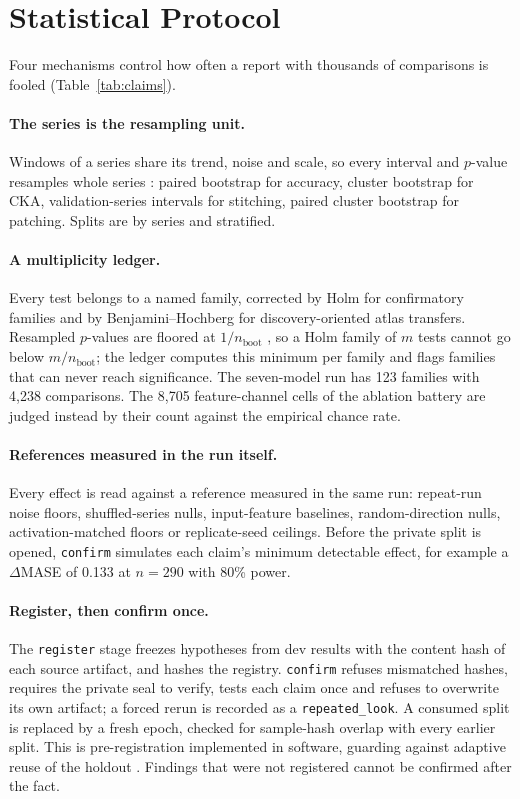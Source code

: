 \section{Statistical Protocol}
\label{sec:statistics}

Four mechanisms control how often a report with thousands of comparisons is fooled (Table~\ref{tab:claims}).

\paragraph{The series is the resampling unit.} Windows of a series share its trend, noise and scale, so every interval
and $p$-value resamples whole series \citep{efron1993bootstrap,cameron2008cluster}: paired bootstrap for accuracy, cluster
bootstrap for CKA, validation-series intervals for stitching, paired cluster bootstrap for patching. Splits are by series
and stratified.

\paragraph{A multiplicity ledger.} Every test belongs to a named family, corrected by Holm for confirmatory families and
by Benjamini--Hochberg for discovery-oriented atlas transfers. Resampled $p$-values are floored at $1/n_{\text{boot}}$
\citep{phipson2010permutation}, so a Holm family of $m$ tests cannot go below $m/n_{\text{boot}}$; the ledger computes
this minimum per family and flags families that can never reach significance. The seven-model run has 123 families with
4{,}238 comparisons. The 8{,}705 feature-channel cells of the ablation battery are judged instead by their count against
the empirical chance rate.

\paragraph{References measured in the run itself.} Every effect is read against a reference measured in the same run:
repeat-run noise floors, shuffled-series nulls, input-feature baselines, random-direction nulls, activation-matched
floors or replicate-seed ceilings. Before the private split is opened, \texttt{confirm} simulates each claim's minimum
detectable effect, for example a $\Delta$MASE of 0.133 at $n=290$ with 80\% power.

\paragraph{Register, then confirm once.} The \texttt{register} stage freezes hypotheses from dev results with the content
hash of each source artifact, and hashes the registry. \texttt{confirm} refuses mismatched hashes, requires the private
seal to verify, tests each claim once and refuses to overwrite its own artifact; a forced rerun is recorded as a
\texttt{repeated\_look}. A consumed split is replaced by a fresh epoch, checked for sample-hash overlap with every earlier
split. This is pre-registration \citep{nosek2018preregistration} implemented in software, guarding against adaptive
reuse of the holdout \citep{dwork2015reusable,gelman2014garden}. Findings that were not registered cannot be confirmed
after the fact.

